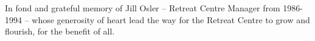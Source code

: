 
\thispagestyle{empty}

{\raggedleft

\vspace*{6\baselineskip}

\begin{minipage}{0.82\linewidth}

In fond and grateful memory of Jill Osler -- Retreat Centre Manager from
1986-1994 -- whose generosity of heart lead the way for the Retreat
Centre to grow and flourish, for the benefit of all.

\end{minipage}

}



